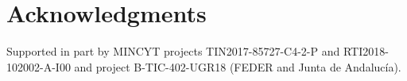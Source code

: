 \documentclass[10pt,journal,compsoc]{IEEEtran}
\begin{document}
\section*{Acknowledgments}

Supported in part by MINCYT projects
TIN2017-85727-C4-2-P and  RTI2018-102002-A-I00 and project
B-TIC-402-UGR18 (FEDER and Junta de Andaluc\'{i}a).











\end{document}

